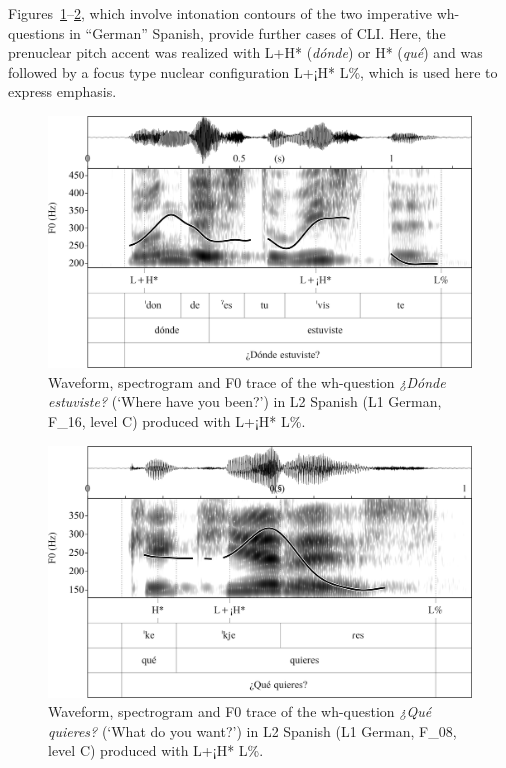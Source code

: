 Figures~\ref{fig:4.119}--\ref{fig:4.120}, which involve intonation contours of the two imperative wh-questions in “German” Spanish, provide further cases of CLI. Here, the prenuclear pitch accent was realized with L+H* (\textit{dónde}) or H* (\textit{qué}) and was followed by a focus type nuclear configuration L+¡H* L\%, which is used here to express emphasis.

\begin{figure}


\includegraphics[width=\textwidth]{figures/Figure_4.119.png}



\caption{Waveform, spectrogram and F0 trace of the wh-question \textit{¿Dónde estuviste?} (‘Where have you been?’) in L2 Spanish (L1 German, F\_16, level C) produced with L+¡H* L\%.}
\label{fig:4.119}
\end{figure}

\begin{figure}


\includegraphics[width=\textwidth]{figures/Figure_4.120.png}



\caption{Waveform, spectrogram and F0 trace of the wh-question \textit{¿Qué quieres?} (‘What do you want?’) in L2 Spanish (L1 German, F\_08, level C) produced with L+¡H* L\%.}
\label{fig:4.120}
\end{figure}

